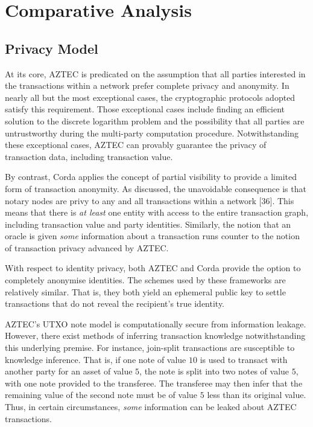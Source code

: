 \section{Comparative Analysis}

\subsection{Privacy Model}

At its core, AZTEC is predicated on the assumption that all parties interested in the transactions within a network prefer complete privacy and anonymity. In nearly all but the most exceptional cases, the cryptographic protocols adopted satisfy this requirement. Those exceptional cases include finding an efficient solution to the discrete logarithm problem and the possibility that all parties are untrustworthy during the multi-party computation procedure. Notwithstanding these exceptional cases, AZTEC can provably guarantee the privacy of transaction data, including transaction value.

By contrast, Corda applies the concept of partial visibility to provide a limited form of transaction anonymity. As discussed, the unavoidable consequence is that notary nodes are privy to any and all transactions within a network [36]. This means that there is \textit{at least} one entity with access to the entire transaction graph, including transaction value and party identities. Similarly, the notion that an oracle is given \textit{some} information about a transaction runs counter to the notion of transaction privacy advanced by AZTEC.

With respect to identity privacy, both AZTEC and Corda provide the option to completely anonymise identities. The schemes used by these frameworks are relatively similar. That is, they both yield an ephemeral public key to settle transactions that do not reveal the recipient's true identity.

AZTEC's UTXO note model is computationally secure from information leakage. However, there exist methods of inferring transaction knowledge notwithstanding this underlying premise. For instance, join-split transactions are susceptible to knowledge inference. That is, if one note of value $10$ is used to transact with another party for an asset of value $5$, the note is split into two notes of value $5$, with one note provided to the transferee. The transferee may then infer that the remaining value of the second note must be of value $5$ less than its original value. Thus, in certain circumstances, \textit{some} information can be leaked about AZTEC transactions.

